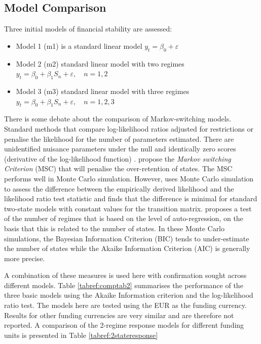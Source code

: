 \documentclass[12pt, a4paper, oneside]{article} %
\begin{document}
\subsection{Model Comparison}
Three initial models of financial stability are assessed: 
\begin{itemize}
\item Model 1 (m1) is a standard linear model $y_t = \beta_0  + \varepsilon$
\item Model 2 (m2) standard linear model with two regimes $y_t = \beta_0 + \beta_1 S_n + \varepsilon, \quad n = 1, 2$
\item Model 3 (m3) standard linear model with three regimes $y_t = \beta_0 + \beta_1 S_n + \varepsilon, \quad n = 1, 2, 3$
\end{itemize}

There is some debate about the comparison of Markov-switching models.  Standard methods that compare log-likelihood ratios adjusted for restrictions or penalise the likelihood for the number of parameters estimated.  There are unidentified nuisance parameters under the null and identically zero scores (derivative of the log-likelihood function) \citet{hansen1992likelihood}.   \citet{Smith2006553} propose the \emph{Markov switching Criterion} (MSC) that will penalise the over-retention of states.  The MSC performs well in Monte Carlo simulation.  However, \citep{garcia1998asymptotic} uses Monte Carlo simulation to assess the difference between the empirically derived likelihood and the likelihood ratio test statistic and finds that the difference is minimal for standard two-state models with constant values for the transition matrix. \citet{citeulike:13372807} proposes a test of the number of regimes that is based on the level of auto-regression, on the basis that this is related to the number of states.  In these Monte Carlo simulations, the Bayesian Information Criterion (BIC) tends to under-estimate the number of states while the Akaike Information Criterion (AIC) is generally more precise. 

A combination of these measures is used here with confirmation sought across different models.  Table \ref{tabref:comptab2} summarises the performance of the three basic models using the Akaike Information criterion and the log-likelihood ratio test.  The models here are tested using the EUR as the funding currency.  Results for other funding currencies are very similar and are therefore not reported.  A comparison of the 2-regime response models for different funding units is presented in Table \ref{tabref:2stateresponse} 
\end{document}

